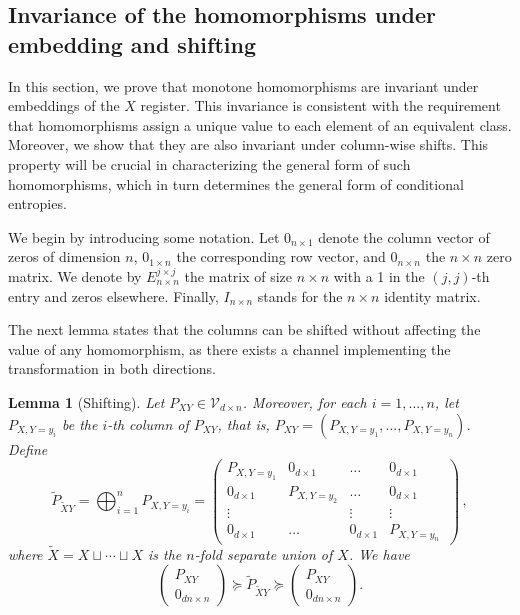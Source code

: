\documentclass[aps,pra,11pt,onecolumn,nofootinbib,tightenlines]{revtex4-2}
\newtheorem{lemma}[theorem]{Lemma}
\theoremstyle{definition}
\newcommand{\V}{\mathcal{V}}
\begin{document}
\subsection{Invariance of the homomorphisms under embedding and shifting}
\label{sec: invariance embedding and shifting}
In this section, we prove that monotone homomorphisms are invariant under embeddings of the $X$ register. This invariance is consistent with the requirement that homomorphisms assign a unique value to each element of an equivalent class. Moreover, we show that they are also invariant under column-wise shifts.
This property will be crucial in characterizing the general form of such homomorphisms, which in turn determines the general form of conditional entropies.

\bigskip
We begin by introducing some notation. Let $0_{n \times 1}$ denote the column vector of zeros of dimension $n$, $0_{1 \times n}$ the corresponding row vector, and $0_{n \times n}$ the $n \times n$ zero matrix. We denote by $E^{j \times j}_{n \times n}$ the matrix of size $n \times n$ with a 1 in the $(j, j)$-th entry and zeros elsewhere. Finally, $I_{n \times n}$ stands for the $n \times n$ identity matrix.


The next lemma states that the columns can be shifted without affecting the value of any homomorphism, as there exists a channel implementing the transformation in both directions.
\begin{lemma}[Shifting]\label{lemma:shifting}
    Let $P_{XY} \in \V_{d\times n}$. Moreover,  for each $i=1,...,n$, let $P_{X,Y=y_i}$ be the $i$-th column of $P_{XY}$, that is, $P_{XY} = (P_{X,Y=y_1},...,P_{X,Y=y_n})$. Define
    \begin{equation}
\widetilde{P}_{\widetilde{X}Y}=\bigoplus_{i=1}^n P_{X,Y=y_i}= \begin{pmatrix}
P_{X,Y=y_1} & 0_{d \times 1}  & \hdots & 0_{d \times 1} \\
0_{d \times 1} & P_{X,Y=y_2} & \hdots & 0_{d \times 1} \\
\vdots &  & \vdots & \vdots\\
0_{d \times 1} & \hdots & 0_{d \times 1} & P_{X,Y=y_n}\,
\end{pmatrix} \,,
\end{equation}
where $\widetilde{X}=X\sqcup\cdots\sqcup X$ is the $n$-fold separate union of $X$. We have
\begin{equation}
 \begin{pmatrix}
        P_{XY}\\
        0_{dn \times n}
    \end{pmatrix}\succeq\widetilde{P}_{\widetilde{X}Y}\succeq  \begin{pmatrix}
        P_{XY}\\
        0_{dn \times n}
    \end{pmatrix}.
\end{equation}
\end{lemma}
\end{document}
